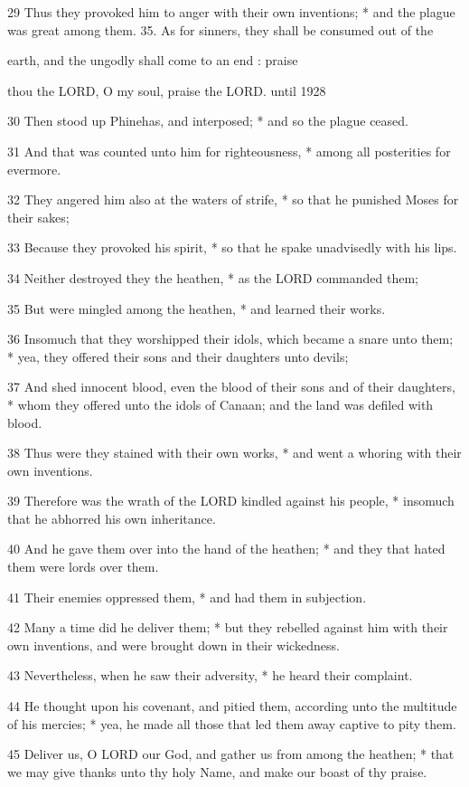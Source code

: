 29 Thus they provoked him to anger with their own inventions;
* and the plague was great among them. 35. As for sinners, they shall
be consumed out of the

earth, and the ungodly shall come to an end : praise

thou the LORD, O my soul, praise the LORD.
until
1928

30 Then stood up Phinehas, and interposed; * and so the plague ceased.

31 And that was counted unto him for righteousness,
* among all posterities for evermore.

32 They angered him also at the waters of strife, *
so that he punished Moses for their sakes;

33 Because they provoked his spirit, * so that he spake
unadvisedly with his lips.

34 Neither destroyed they the heathen, * as the LORD
commanded them;

35 But were mingled among the heathen, * and learned
their works.

36 Insomuch that they worshipped their idols, which
became a snare unto them; * yea, they offered their sons and their daughters
unto devils;

37 And shed innocent blood, even the blood of their
sons and of their daughters, * whom they offered unto the idols of Canaan;
and the land was defiled with blood.

38 Thus were they stained with their own works, * and
went a whoring with their own inventions.

39 Therefore was the wrath of the LORD
kindled against his people, * insomuch that he abhorred his own inheritance.

40 And he gave them over into the hand of the heathen;
* and they that hated them were lords over them.

41 Their enemies oppressed them, * and had them in
subjection.

42 Many a time did he deliver them; * but they rebelled
against him with their own inventions, and were brought down in their
wickedness.

43 Nevertheless, when he saw their adversity, * he
heard their complaint.

44 He thought upon his covenant, and pitied them, according
unto the multitude of his mercies; * yea, he made all those that led them
away captive to pity them.

45 Deliver us, O LORD our God,
and gather us from among the heathen; * that we may give thanks unto thy
holy Name, and make our boast of thy praise.

